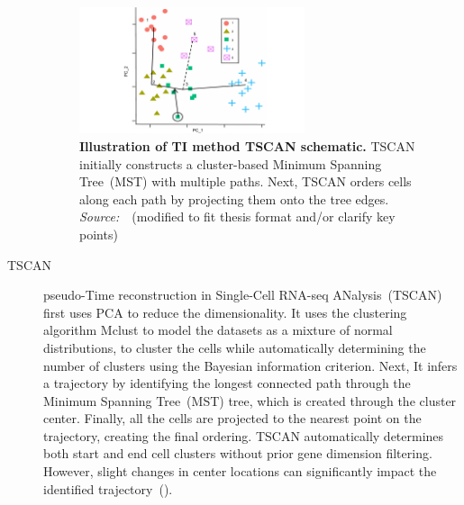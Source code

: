 \begin{description}
\begin{figure}[h!]
  	\centering
  	\includegraphics[width=0.65\textwidth]{TI_Alg_TSCAN/fig}
  	\vspace{0.1cm}
  	\caption[Illustration of TI method TSCAN schematic.]{\textbf{Illustration of TI method TSCAN schematic.}
  	TSCAN initially constructs a cluster-based Minimum Spanning Tree~(MST) with multiple paths. Next, TSCAN orders cells along each path by projecting them onto the tree edges. \emph{Source:~\cite{ji2016tscan}}~(modified to fit thesis format and/or clarify key points)
  	}
  	\label{fig:TI_Alg_TSCAN}
\end{figure}

  \item[TSCAN]
  pseudo-Time reconstruction in Single-Cell RNA-seq ANalysis~(TSCAN)~\citep{ji2016tscan} first uses PCA to reduce the dimensionality. It uses the clustering algorithm Mclust to model the datasets as a mixture of normal distributions, to cluster the cells while automatically determining the number of clusters using the Bayesian information criterion. Next, It infers a trajectory by identifying the longest connected path through the Minimum Spanning Tree~(MST) tree, which is created through the cluster center. Finally, all the cells are projected to the nearest point on the trajectory, creating the final ordering. TSCAN automatically determines both start and end cell clusters without prior gene dimension filtering. However, slight changes in center locations can significantly impact the identified trajectory~().


\end{description}

